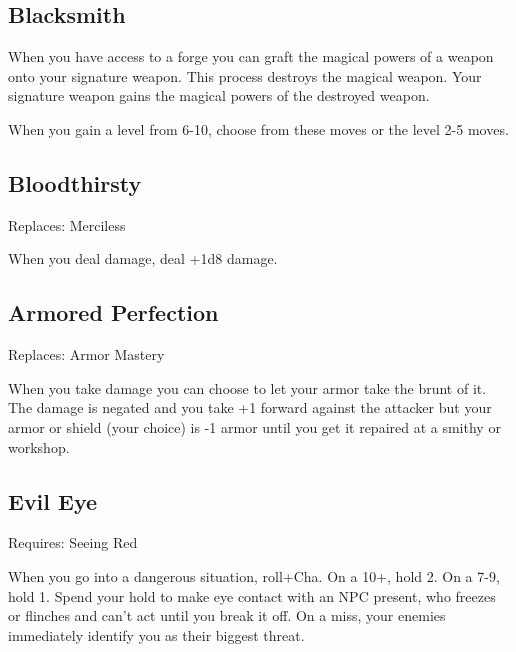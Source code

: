          
\subsection{Blacksmith}   
         

When you have access to a forge you can graft the magical powers of a weapon onto your signature weapon. This process destroys the magical weapon. Your signature weapon gains the magical powers of the destroyed weapon.

         
\startInstructions
When you gain a level from 6-10, choose from these moves or the level 2-5 moves.
\stopInstructions
         
\subsection{Bloodthirsty}   
         

Replaces: Merciless

         

When you deal damage, deal +1d8 damage.

         
\subsection{Armored Perfection}    
         

Replaces: Armor Mastery

         

When you take damage you can choose to let your armor take the brunt of it. The damage is negated and you take +1 forward against the attacker but your armor or shield (your choice) is -1 armor until you get it repaired at a smithy or workshop.

         
\subsection{Evil Eye}    
         

Requires: Seeing Red

         

When you go into a dangerous situation, roll+Cha. On a 10+, hold 2. On a 7-9, hold 1. Spend your hold to make eye contact with an NPC present, who freezes or flinches and can't act until you break it off. On a miss, your enemies immediately identify you as their biggest threat.

